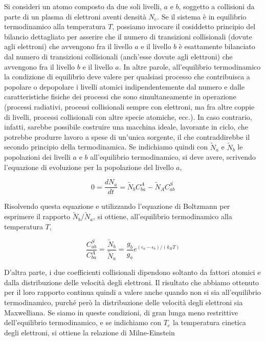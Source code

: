 Si consideri un atomo composto da due soli livelli, $a$ e $b$, soggetto a collisioni da parte di un plasma di elettroni aventi densità $N_e$. Se il sistema è in equilibrio termodinamico alla temperatura $T$, possiamo invocare il cosiddetto principio del bilancio dettagliato per asserire che il numero di transizioni collisionali (dovute agli elettroni) che avvengono fra il livello $a$ e il livello $b$ è esattamente bilanciato dal numero di transizioni collisionali (anch'esse dovute agli elettroni) che avvengono fra il livello $b$ e il livello $a$. In altre parole, all'equilibrio termodinamico la condizione di equilibrio deve valere per qualsiasi processo che contribuisca a popolare o depopolare i livelli atomici indipendentemente dal numero e dalle caratteristiche fisiche dei processi che sono simultaneamente in operazione (processi radiativi, processi collisionali sempre con elettroni, ma fra altre coppie di livelli, processi collisionali con altre specie atomiche, ecc.). In caso contrario, infatti, sarebbe possibile costruire una macchina ideale, lavorante in ciclo, che potrebbe produrre lavoro a spese di un'unica sorgente, il che contraddirebbe il secondo principio della termodinamica. Se indichiamo quindi con $\tilde{N}_a$ e $\tilde{N}_b$ le popolazioni dei livelli $a$ e $b$ all'equilibrio termodinamico, si deve avere, scrivendo l'equazione di evoluzione per la popolazione del livello $a$,

\begin{equation*}
  0=\frac{dN_a}{dt}=\tilde{N}_b C_{ba}^A - \tilde{N}_A C_{ab}^S
\end{equation*}

Risolvendo questa equazione e utilizzando l'equazione di Boltzmann per esprimere il rapporto $\tilde{N}_b/\tilde{N}_a$, si ottiene, all'equilibrio termodinamico alla temperatura $T$,

\begin{equation*}
  \frac{C_{ab}^S}{C_{ba}^A}=\frac{\tilde{N}_b}{\tilde{N}_a}=\frac{g_b}{g_a}e^{(\epsilon_a - \epsilon_b)/(k_B T)}
\end{equation*}

D'altra parte, i due coefficienti collisionali dipendono soltanto da fattori atomici e dalla distribuzione delle velocità degli elettroni. Il risultato che abbiamo ottenuto per il loro rapporto continua quindi a valere anche quando non si sia all'equilibrio termodinamico, purché però la distribuzione delle velocità degli elettroni sia Maxwelliana. Se siamo in queste condizioni, di gran lunga meno restrittive dell'equilibrio termodinamico, e se indichiamo con $T_e$ la temperatura cinetica degli elettroni, si ottiene la relazione di Milne-Einstein

